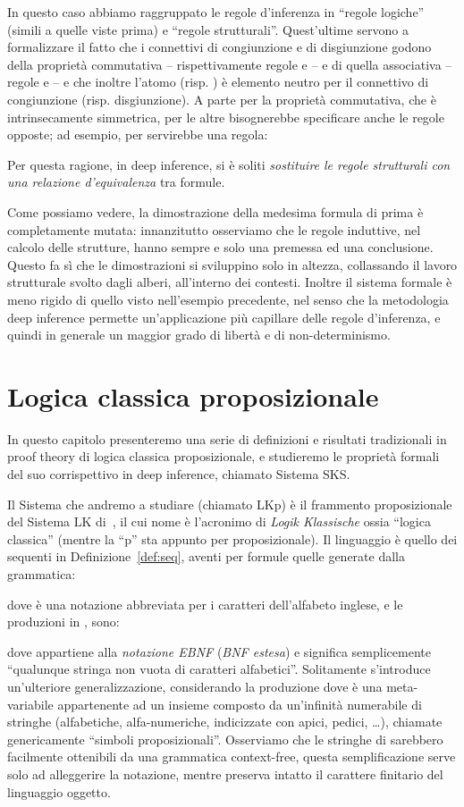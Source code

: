 \documentclass[12pt,a4paper,openright,twoside]{report}
\begin{document}
In questo caso abbiamo raggruppato le regole d'inferenza in ``regole logiche'' (simili a quelle viste prima) e ``regole strutturali''. Quest'ultime servono a formalizzare il fatto che i connettivi di congiunzione e di disgiunzione godono della propriet\`a commutativa -- rispettivamente regole  e  -- e di quella associativa -- regole  e  -- e che inoltre l'atomo  (risp. ) \`e elemento neutro per il connettivo di congiunzione (risp. disgiunzione). A parte per la propriet\`a commutativa, che \`e intrinsecamente simmetrica, per le altre bisognerebbe specificare anche le regole opposte; ad esempio, per  servirebbe una regola:

Per questa ragione, in deep inference, si \`e soliti \emph{sostituire le regole strutturali con una relazione d'equivalenza} tra formule.

Come possiamo vedere, la dimostrazione della medesima formula di prima \`e completamente mutata: innanzitutto osserviamo che le regole induttive, nel calcolo delle strutture, hanno sempre e solo una premessa ed una conclusione. Questo fa s\`i che le dimostrazioni si sviluppino solo in altezza, collassando il lavoro strutturale svolto dagli alberi, all'interno dei contesti. Inoltre il sistema formale \`e meno rigido di quello visto nell'esempio precedente, nel senso che la metodologia deep inference permette un'applicazione pi\`u capillare delle regole d'inferenza, e quindi in generale un maggior grado di libert\`a e di non-determinismo.


\chapter{Logica classica proposizionale}
In questo capitolo presenteremo una serie di definizioni e risultati tradizionali in proof theory di logica classica proposizionale, e studieremo le propriet\`a formali del suo corrispettivo in deep inference, chiamato Sistema \textsf{SKS}.

Il Sistema che andremo a studiare (chiamato \textsf{LKp}) \`e il frammento proposizionale del Sistema \textsf{LK} di~\cite{Gen35}, il cui nome \`e l'acronimo di \emph{Logik Klassische} ossia ``logica classica'' (mentre la ``p'' sta appunto per proposizionale). Il linguaggio  \`e quello dei sequenti in Definizione~\ref{def:seq}, aventi per formule quelle generate dalla grammatica:

dove  \`e una notazione abbreviata per i caratteri dell'alfabeto inglese, e le produzioni in , sono:

dove  appartiene alla \emph{notazione EBNF} (\emph{BNF estesa}) e significa semplicemente ``qualunque stringa non vuota di caratteri alfabetici''. Solitamente s'introduce un'ulteriore generalizzazione, considerando la produzione  dove  \`e una meta-variabile appartenente ad un insieme  composto da un'infinit\`a numerabile di stringhe (alfabetiche, alfa-numeriche, indicizzate con apici, pedici, \ldots), chiamate genericamente ``simboli proposizionali''. Osserviamo che le stringhe di  sarebbero facilmente ottenibili da una grammatica context-free, questa semplificazione serve solo ad alleggerire la notazione, mentre preserva intatto il carattere finitario del linguaggio oggetto.
\end{document}
